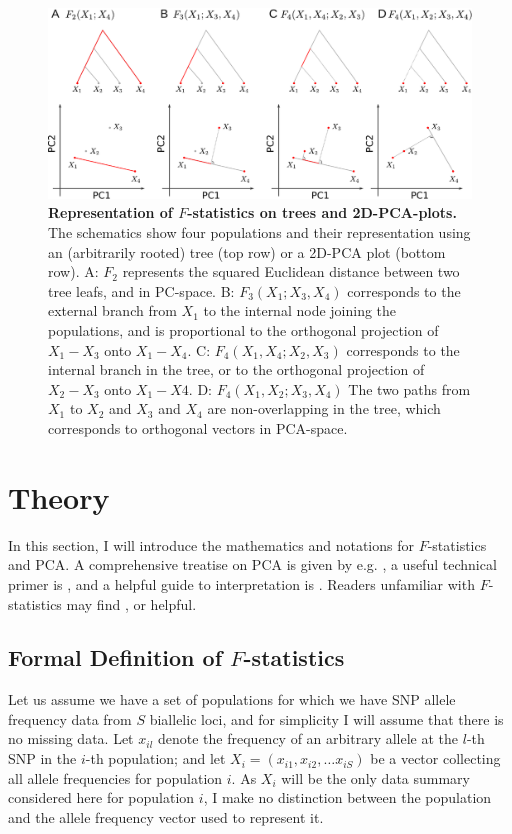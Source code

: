 \documentclass[12pt,fullpage, a4paper]{article}
\begin{document}
\begin{figure}[!ht]
	\includegraphics[width=\textwidth]{figures/fstats_pca_vs_tree.pdf}
	\caption{\textbf{Representation of $F$-statistics on trees and 2D-PCA-plots.} The schematics show four populations and their representation using an (arbitrarily rooted) tree (top row) or a 2D-PCA plot (bottom row). A: $F_2$ represents the squared Euclidean distance between two tree leafs, and in PC-space. B: $F_3(X_1; X_3, X_4)$ corresponds to the external branch from $X_1$ to the internal node joining the populations, and is proportional to the orthogonal projection of $X_1 - X_3$ onto $X_1-X_4$. C: $F_4(X_1, X_4; X_2, X_3)$ corresponds to the internal branch in the tree, or to the orthogonal projection of $X_2 - X_3$ onto $X_1 - X4$. D: $F_4(X_1, X_2; X_3, X_4)$ The two paths from $X_1$ to $X_2$ and $X_3$ and $X_4$ are non-overlapping in the tree, which corresponds to orthogonal vectors in PCA-space.}
	\label{fig:geom}
\end{figure}	
	
\section{Theory}
In this section, I will introduce the mathematics and notations for $F$-statistics and PCA. A comprehensive  treatise on PCA is given by e.g. \cite{jolliffe2013}, a useful technical primer is \cite{pachter2014}, and a helpful guide to interpretation is \cite{cavalli-sforza1994}. Readers unfamiliar with $F$-statistics may find \cite{patterson2012}, \cite{peter2016} or \cite{oteo-garcia2021} helpful.

\subsection{Formal Definition of $F$-statistics}
Let us assume we have a set of populations for which we have SNP allele frequency data from $S$ biallelic loci, and for simplicity I will assume that there is no missing data. Let $x_{il}$ denote the frequency of an arbitrary allele at the $l$-th SNP in the $i$-th population; and let $X_i = (x_{i1}, x_{i2}, \dots x_{iS})$  be a vector collecting all allele frequencies for population $i$. As $X_i$ will be the only data summary considered here for population $i$, I make no distinction between the population and the allele frequency vector used to represent it.
\end{document}
